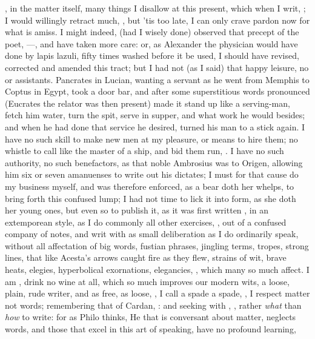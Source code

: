 {, in the matter itself, many things I disallow at
this present, which when I writ, ; I
would willingly retract much, \etc, but 'tis too late, I can only crave
pardon now for what is amiss. I might indeed, (had I wisely done)
observed that precept of the poet, ---, and
have taken more care: or, as Alexander the physician would have done by
lapis lazuli, fifty times washed before it be used, I should have
revised, corrected and amended this tract; but I had not (as I said)
that happy leisure, no  or assistants. Pancrates in
Lucian, wanting a servant as he went from Memphis to Coptus in
Egypt, took a door bar, and after some superstitious words pronounced
(Eucrates the relator was then present) made it stand up like a
serving-man, fetch him water, turn the spit, serve in supper, and what
work he would besides; and when he had done that service he desired,
turned his man to a stick again. I have no such skill to make new men
at my pleasure, or means to hire them; no whistle to call like the
master of a ship, and bid them run, \etc. I have no such authority, no
such benefactors, as that noble Ambrosius was to Origen, allowing
him six or seven amanuenses to write out his dictates; I must for that
cause do my business myself, and was therefore enforced, as a bear doth
her whelps, to bring forth this confused lump; I had not time to lick
it into form, as she doth her young ones, but even so to publish it, as
it was first written , in an extemporean style,
as I do commonly all other exercises, , out of a confused company of notes, and writ with as small
deliberation as I do ordinarily speak, without all affectation of big
words, fustian phrases, jingling terms, tropes, strong lines, that like
Acesta's arrows caught fire as they flew, strains of wit, brave
heats, elegies, hyperbolical exornations, elegancies, \etc, which many
so much affect. I am , drink no wine at all, which so
much improves our modern wits, a loose, plain, rude writer,  and as free, as loose, , I call a spade a spade, , I
respect matter not words; remembering that of Cardan, : and seeking with \Seneca, , rather \emph{what} than \emph{how} to write: for as Philo thinks,
He that is conversant about matter, neglects words, and those that
excel in this art of speaking, have no profound learning,

}
